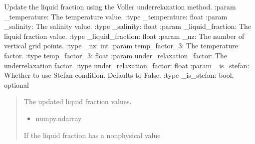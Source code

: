 \documentclass[a4paper,11pt,english,openany]{sphinxmanual}
\begin{document}
\begin{fulllineitems}
\label{\detokenize{api/spyice.update_physical_values:src.spyice.update_physical_values.update_liquid_fraction_voller_under_relaxation}}
\pysigstartsignatures
\pysiglinewithargsret
{}
{\sphinxparamcomma {}\sphinxparamcomma {}\sphinxparamcomma {}\sphinxparamcomma {}\sphinxparamcomma {}\sphinxparamcomma {}\sphinxparamcomma {}\sphinxparamcomma {}\sphinxparamcomma {}\sphinxparamcomma {}\sphinxparamcomma {}\sphinxparamcomma {}\sphinxparamcomma {}}
{}
\pysigstopsignatures
\sphinxAtStartPar
Update the liquid fraction using the Voller under\sphinxhyphen{}relaxation method.
:param \sphinxhyphen{} \_temperature: The temperature value.
:type \sphinxhyphen{} \_temperature: float
:param \sphinxhyphen{} \_salinity: The salinity value.
:type \sphinxhyphen{} \_salinity: float
:param \sphinxhyphen{} \_liquid\_fraction: The liquid fraction value.
:type \sphinxhyphen{} \_liquid\_fraction: float
:param \sphinxhyphen{} \_nz: The number of vertical grid points.
:type \sphinxhyphen{} \_nz: int
:param \sphinxhyphen{} temp\_factor\_3: The temperature factor.
:type \sphinxhyphen{} temp\_factor\_3: float
:param \sphinxhyphen{} under\_relaxation\_factor: The under\sphinxhyphen{}relaxation factor.
:type \sphinxhyphen{} under\_relaxation\_factor: float
:param \sphinxhyphen{} \_is\_stefan: Whether to use Stefan condition. Defaults to False.
:type \sphinxhyphen{} \_is\_stefan: bool, optional
\begin{quote}\begin{description}
\sphinxAtStartPar
The updated liquid fraction values.

\sphinxAtStartPar
\begin{itemize}
\item {} 
\sphinxAtStartPar
numpy.ndarray

\end{itemize}


\sphinxAtStartPar
{} \textendash{} If the liquid fraction has a non\sphinxhyphen{}physical value

\end{description}\end{quote}

\end{fulllineitems}
\end{document}
